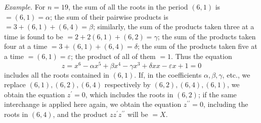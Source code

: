 \textit{Example.} For \(n=19\), the sum of all the roots in the period \((6,1)\) is \(=(6,1)=\alpha\); the sum of their pairwise products is \(=3+(6,1)+(6,4)=\beta\); similarly,
the sum of the products taken three at a time is found to be \(=2+2(6,1)+(6,2)=\gamma\); the sum of the products taken four at a time \(=3+(6,1)+(6,4)=\delta\); the sum of the products taken five at a time \(=(6,1)=\varepsilon\); the product of all of them \(=1\). Thus the equation \[z=x^6-\alpha x^5+\beta x^4-\gamma x^3+\delta xx-\varepsilon x+1=0\] includes all the roots contained in \((6,1)\). If, in the coefficients \(\alpha,\allowbreak \beta,\allowbreak \gamma\), etc., we replace \((6,1),\allowbreak (6,2),\allowbreak (6,4)\) respectively by \((6,2),\allowbreak (6,4),\allowbreak (6,1)\), we obtain the equation \(z^{\prime}=0\), which includes the roots in \((6,2)\); if the same interchange is applied here again, we obtain the equation \(z^{\prime\prime}=0\), including the roots in \((6,4)\), and the product \(zz^{\prime}z^{\prime\prime}\) will be \(=X\).

